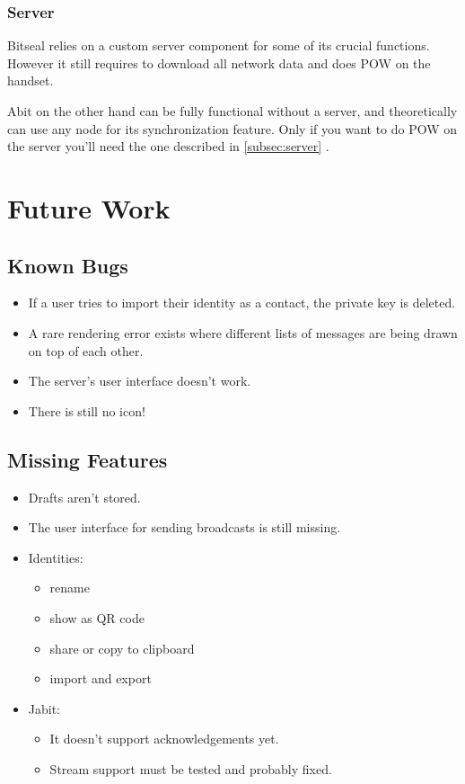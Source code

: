 \documentclass{bfh}
\begin{document}
  \subsubsection{Server}
  Bitseal relies on a custom server component for some of its crucial functions. However it still requires to download all network data and does \ac{POW} on the handset.

  Abit on the other hand can be fully functional without a server, and theoretically can use any node for its synchronization feature. Only if you want to do \ac{POW} on the server you'll need the one described in \ref{subsec:server} .


  \newpage
  \section{Future Work}
  \subsection{Known Bugs}
  \begin{itemize}
    \item If a user tries to import their identity as a contact, the private key is deleted.
    \item A rare rendering error exists where different lists of messages are being drawn on top of each other.
    \item The server's user interface doesn't work.
    \item There is still no icon!
  \end{itemize}

  \subsection{Missing Features}
  \begin{itemize}
    \item Drafts aren't stored.
    \item The user interface for sending broadcasts is still missing.
    \item Identities:
      \begin{itemize}
        \item rename
        \item show as QR code
        \item share or copy to clipboard
        \item import and export
      \end{itemize}
    \item Jabit:
      \begin{itemize}
        \item It doesn't support acknowledgements yet.
        \item Stream support must be tested and probably fixed.
      \end{itemize}
  \end{itemize}
\end{document}
